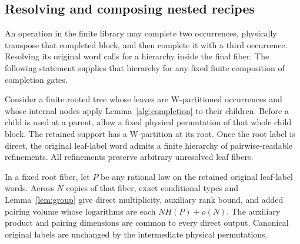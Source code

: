 \subsection{Resolving and composing nested recipes}

An operation in the finite library may complete two occurrences, physically
transpose that completed block, and then complete it with a third
occurrence.  Resolving its original word calls for a hierarchy inside the
final fiber.  The following statement supplies that hierarchy for any
fixed finite composition of completion gates.

\begin{lemma}
\label{alg:completion-hierarchy}
Consider a finite rooted tree whose leaves are W-partitioned occurrences
and whose internal nodes apply Lemma~\ref{alg:completion} to their children.
Before a child is used at a parent, allow a fixed physical permutation of
that whole child block.  The retained support has a W-partition at its
root.  Once the root label is direct, the original leaf-label word admits
a finite hierarchy of pairwise-readable refinements.  All refinements
preserve arbitrary unresolved leaf fibers.

In a fixed root fiber, let \(P\) be any rational law on the retained
original leaf-label words.  Across \(N\) copies of that fiber, exact
conditional types and Lemma~\ref{lem:group} give direct multiplicity,
auxiliary rank bound, and added pairing volume whose logarithms are each
\(NH(P)+o(N)\).  The auxiliary product and pairing dimensions are common
to every direct output.  Canonical original labels are unchanged by the
intermediate physical permutations.
\end{lemma}
